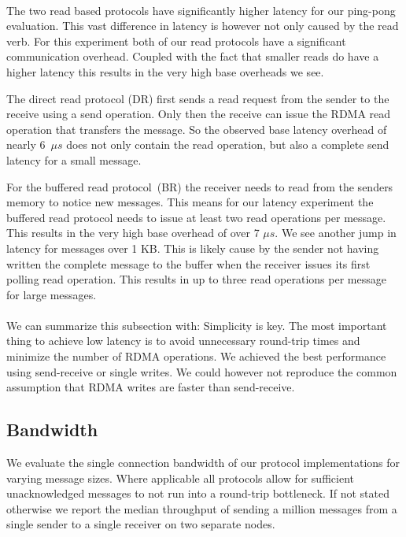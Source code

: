 \paragraph{} The two read based protocols have significantly higher latency for our ping-pong evaluation. This vast
difference in latency 
is however not only caused by the read verb. For this experiment both of our read protocols have a significant 
communication overhead. Coupled with the fact that smaller reads do have a higher latency this results in the very high
base overheads we see.

The direct read protocol (DR) first sends a read request from the sender to the receive using a send operation. Only then the
receive can issue the RDMA read operation that transfers the message. So the observed base latency overhead of 
nearly 6~$\mu s$
does not only contain the read operation, but also a complete send latency for a small message.

For the buffered read protocol~(BR) the receiver needs to read from the senders memory to notice new messages. 
This means for our
latency experiment the buffered read protocol needs to issue at least two read operations per message. This results in the
very high base overhead of over 7 $\mu s$. We see another jump in latency for messages over 1 KB. This is likely cause by the
sender not having written the complete message to the buffer when the receiver issues its first polling read operation. 
This results in up to three read operations per message for large messages.

\paragraph{} We can summarize this subsection with: Simplicity is key. The most important thing to achieve low 
latency is to avoid unnecessary round-trip times and minimize the number of RDMA operations. We achieved the best
performance  using send-receive or single writes. We could however not reproduce the common assumption that RDMA writes 
are faster than send-receive.






\pagebreak

\subsection{Bandwidth}

We evaluate the single connection bandwidth of our protocol implementations for varying message sizes. Where applicable all 
protocols allow for sufficient unacknowledged messages to not run into a round-trip bottleneck. If not 
stated otherwise we report the median throughput of sending a million messages from a single sender to a single receiver
on two separate nodes.

